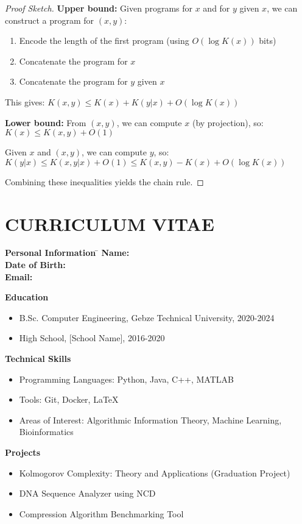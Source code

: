 \documentclass[12pt,a4paper]{report}
\begin{document}
\begin{proof}[Proof Sketch]
\textbf{Upper bound:} Given programs for $x$ and for $y$ given $x$, we can construct a program for $(x, y)$:

\begin{enumerate}
    \item Encode the length of the first program (using $O(\log K(x))$ bits)
    \item Concatenate the program for $x$
    \item Concatenate the program for $y$ given $x$
\end{enumerate}

This gives: $K(x, y) \leq K(x) + K(y|x) + O(\log K(x))$

\textbf{Lower bound:} From $(x, y)$, we can compute $x$ (by projection), so:
$K(x) \leq K(x, y) + O(1)$

Given $x$ and $(x, y)$, we can compute $y$, so:
$K(y|x) \leq K(x, y|x) + O(1) \leq K(x, y) - K(x) + O(\log K(x))$

Combining these inequalities yields the chain rule.
\end{proof}

\chapter*{CURRICULUM VITAE}

\begin{tabbing}
\textbf{Personal Information} \= \kill
\textbf{Name:} \\
\textbf{Date of Birth:} \> [Date]\\
\textbf{Email:} \> [Email]\\
\end{tabbing}

\textbf{Education}
\begin{itemize}
    \item B.Sc. Computer Engineering, Gebze Technical University, 2020-2024
    \item High School, [School Name], 2016-2020
\end{itemize}

\textbf{Technical Skills}
\begin{itemize}
    \item Programming Languages: Python, Java, C++, MATLAB
    \item Tools: Git, Docker, LaTeX
    \item Areas of Interest: Algorithmic Information Theory, Machine Learning, Bioinformatics
\end{itemize}

\textbf{Projects}
\begin{itemize}
    \item Kolmogorov Complexity: Theory and Applications (Graduation Project)
    \item DNA Sequence Analyzer using NCD
    \item Compression Algorithm Benchmarking Tool
\end{itemize}
\end{document}
